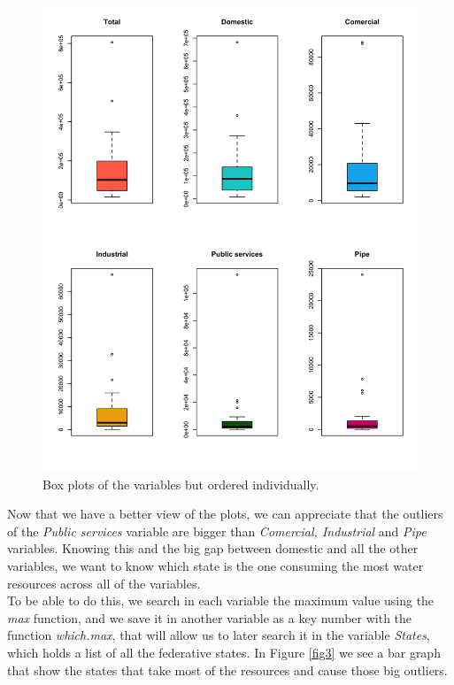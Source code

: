 \documentclass{article}
\begin{document}
\begin{figure}[htp]
	\centering
	\includegraphics[width=\linewidth]{prueba1.png}
	\caption{Box plots of the variables but ordered individually.}\label{fig2}
\end{figure}

\clearpage

Now that we have a better view of the plots, we can appreciate that the outliers of the \textit{Public services} variable are bigger than \textit{Comercial, Industrial} and \textit{Pipe} variables. Knowing this and the big gap between domestic and all the other variables, we want to know which state is the one consuming the most water resources across all of the variables. \\

To be able to do this, we search in each variable the maximum value using the \textit{max} function, and we save it in another variable as a key number with the function \textit{which.max}, that will allow us to later search it in the variable \textit{States}, which holds a list of all the federative states. In Figure \ref{fig3} we see a bar graph that show the states that take most of the resources and cause those big outliers.\\
\end{document}
